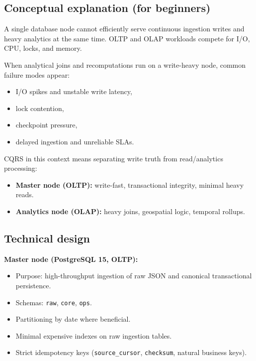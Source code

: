 \documentclass[11pt,a4paper]{article}
\begin{document}
\subsection{Conceptual explanation (for beginners)}
\begin{conceptbox}
A single database node cannot efficiently serve continuous ingestion writes and heavy analytics at the same time. OLTP and OLAP workloads compete for I/O, CPU, locks, and memory.

When analytical joins and recomputations run on a write-heavy node, common failure modes appear:
\begin{itemize}[leftmargin=1.4em]
  \item I/O spikes and unstable write latency,
  \item lock contention,
  \item checkpoint pressure,
  \item delayed ingestion and unreliable SLAs.
\end{itemize}

CQRS in this context means separating write truth from read/analytics processing:
\begin{itemize}[leftmargin=1.4em]
  \item \textbf{Master node (OLTP):} write-fast, transactional integrity, minimal heavy reads.
  \item \textbf{Analytics node (OLAP):} heavy joins, geospatial logic, temporal rollups.
\end{itemize}
\end{conceptbox}

\subsection{Technical design}
\textbf{Master node (PostgreSQL 15, OLTP):}
\begin{itemize}[leftmargin=1.4em]
  \item Purpose: high-throughput ingestion of raw JSON and canonical transactional persistence.
  \item Schemas: \texttt{raw}, \texttt{core}, \texttt{ops}.
  \item Partitioning by date where beneficial.
  \item Minimal expensive indexes on raw ingestion tables.
  \item Strict idempotency keys (\texttt{source\_cursor}, \texttt{checksum}, natural business keys).
\end{itemize}
\end{document}
